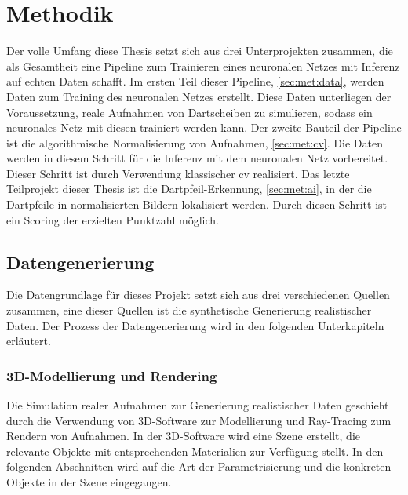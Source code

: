 
\chapter{Methodik}
\label{cha:met}

Der volle Umfang diese Thesis setzt sich aus drei Unterprojekten zusammen, die als Gesamtheit eine Pipeline zum Trainieren eines neuronalen Netzes mit Inferenz auf echten Daten schafft. Im ersten Teil dieser Pipeline, \autoref{sec:met:data}, werden Daten zum Training des neuronalen Netzes erstellt. Diese Daten unterliegen der Voraussetzung, reale Aufnahmen von Dartscheiben zu simulieren, sodass ein neuronales Netz mit diesen trainiert werden kann. Der zweite Bauteil der Pipeline ist die algorithmische Normalisierung von Aufnahmen, \autoref{sec:met:cv}. Die Daten werden in diesem Schritt für die Inferenz mit dem neuronalen Netz vorbereitet. Dieser Schritt ist durch Verwendung klassischer \ac{cv} realisiert. Das letzte Teilprojekt dieser Thesis ist die Dartpfeil-Erkennung, \autoref{sec:met:ai}, in der die Dartpfeile in normalisierten Bildern lokalisiert werden. Durch diesen Schritt ist ein Scoring der erzielten Punktzahl möglich.

\section{Datengenerierung}
\label{sec:met:data}

Die Datengrundlage für dieses Projekt setzt sich aus drei verschiedenen Quellen zusammen, eine dieser Quellen ist die synthetische Generierung realistischer Daten. Der Prozess der Datengenerierung wird in den folgenden Unterkapiteln erläutert.

\subsection{3D-Modellierung und Rendering}
\label{sec:met:data:model}

Die Simulation realer Aufnahmen zur Generierung realistischer Daten geschieht durch die Verwendung von 3D-Software zur Modellierung und Ray-Tracing zum Rendern von Aufnahmen. In der 3D-Software wird eine Szene erstellt, die relevante Objekte mit entsprechenden Materialien zur Verfügung stellt. In den folgenden Abschnitten wird auf die Art der Parametrisierung und die konkreten Objekte in der Szene eingegangen.

